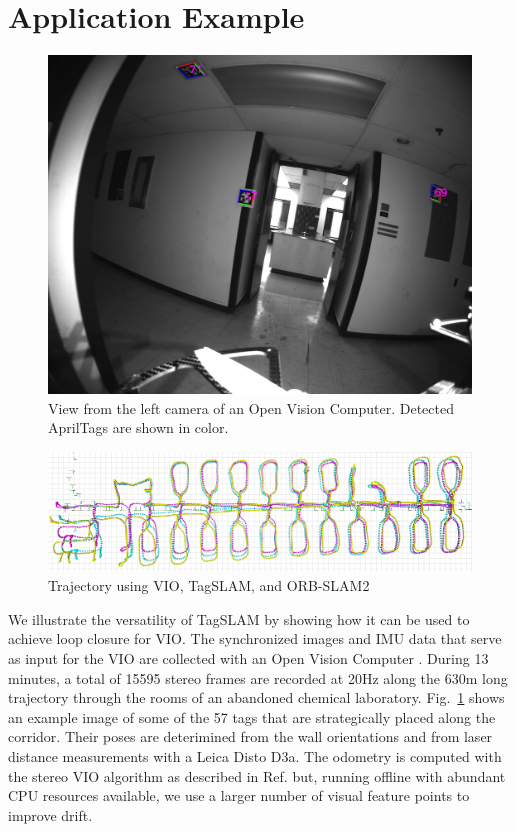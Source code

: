 \section{Application Example}
\begin{figure}[t]
  \centering
  \includegraphics[width=\columnwidth]{corridor_ovc.png}
  \caption{View from the left camera of an Open Vision
    Computer. Detected AprilTags are shown in color.}
  \label{fig:corridor_ovc}
\end{figure}
\begin{figure}[t]
  \centering
  \includegraphics[angle=90, width=0.6\columnwidth]{loop_closure_building_227.png}
  \caption{Trajectory using {\color{cyan} VIO}, {\color{magenta} TagSLAM},
    and {\color{yellow} ORB-SLAM2}}
  \label{fig:loop_closure}
\end{figure}
We illustrate the versatility of TagSLAM by showing how it can be used
to achieve loop closure for VIO. The synchronized images and IMU data
that serve as input for the VIO are collected with an Open Vision
Computer \cite{quigley2018}. During 13 minutes, a total of 15595
stereo frames are recorded at 20Hz along the 630m long trajectory
through the rooms of an abandoned chemical
laboratory. Fig.\ \ref{fig:corridor_ovc} shows an example image of
some of the 57 tags that are strategically placed along the
corridor. Their poses are deterimined from the wall orientations and
from laser distance measurements with a Leica Disto D3a. The odometry
is computed with the stereo VIO algorithm as described in
Ref. \cite{sun2018} but, running offline with abundant CPU resources
available, we use a larger number of visual feature points to improve
drift.

